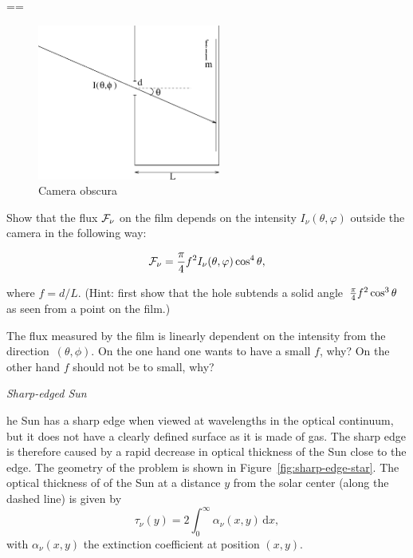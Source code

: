 \documentclass[12pt]{article}
\numberwithin{equation}{section}
\def\dd{\mathrm{d}}
\def\taunu{\ensuremath{\tau_{\nu}}}
\newcommand{\be}{\begin{equation}}
\newcommand{\ee}{\end{equation}}
\newcommand{\opgave}[1]{\medbreak\item{\em #1}\par\nobreak\noindent\let\next}
\newcounter{vraag}	\newcounter{lastvraag}
\newenvironment{opgaven}%
    {\begin{list}{\arabic{vraag}.}{\usecounter{vraag}%
        \listparindent=\parindent \parsep=\parskip}}%
    {\setcounter{lastvraag}{\value{vraag}} \end{list}}
\begin{document}
\begin{opgaven}
\begin{figure}
     \includegraphics[width=6cm]{figs/camera}
    \caption{Camera obscura} \label{fig:camera}
\end{figure}

Show that the flux ${\cal F}_{\nu}$ on the film depends on the
intensity $I_{\nu}(\theta,\varphi)$ outside the camera in the
following way:

 \begin{equation}
     \label{eq:flux-camera}
     {\cal F}_\nu = \frac{\pi}{4} f^{2} I_\nu(\theta,\varphi) \cos^4 \theta ,
 \end{equation}

where $f=d/L$. (Hint: first show that the hole subtends a solid
angle~${\pi \over 4} f^2 \cos^3 \theta$ as seen from a point on the
film.)

The flux measured by the film is linearly dependent on the intensity
from the direction~$(\theta,\phi)$. On the one hand one wants to have a
small $f$, why? On the other hand $f$ should not be to small, why?


\opgave{Sharp-edged Sun}

The Sun has a sharp edge when viewed at wavelengths in the optical continuum, but it does not have a clearly defined surface as it is made of gas. The sharp edge is therefore caused by a rapid decrease in optical thickness of the Sun close to the edge. The geometry of the problem is shown in Figure~\ref{fig:sharp-edge-star}. The optical thickness of of the Sun at a distance $y$ from the solar center (along the dashed line) is given by
\be
\taunu(y) = 2 \int_0^\infty \alpha_\nu(x,y) \, \dd x,
\ee
with $\alpha_\nu(x,y)$ the extinction coefficient at position $(x,y)$.


\end{opgaven}
\end{document}
